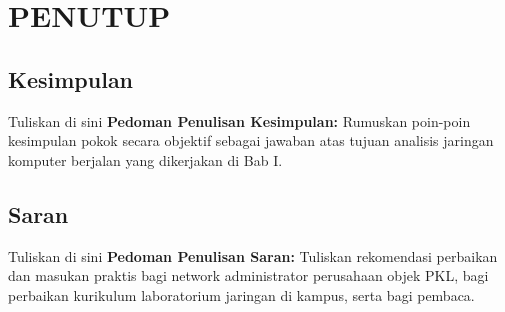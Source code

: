 \chapter{PENUTUP}
\section{Kesimpulan}


Tuliskan di sini \textbf{Pedoman Penulisan Kesimpulan:} Rumuskan poin-poin kesimpulan pokok secara objektif sebagai jawaban atas tujuan analisis jaringan komputer berjalan yang dikerjakan di Bab I.


\section{Saran}


Tuliskan di sini \textbf{Pedoman Penulisan Saran:} Tuliskan rekomendasi perbaikan dan masukan praktis bagi network administrator perusahaan objek PKL, bagi perbaikan kurikulum laboratorium jaringan di kampus, serta bagi pembaca.

